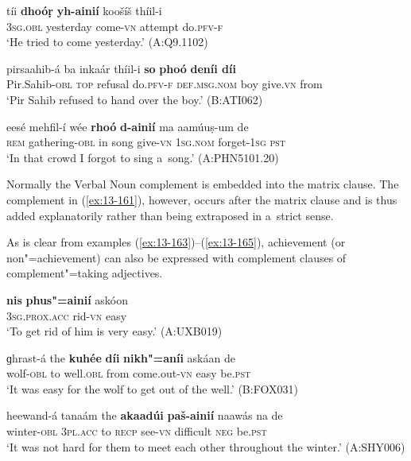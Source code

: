 \begin{exe}
\ex
\label{ex:13-160}
\gll tíi \textbf{dhoóṛ} \textbf{yh-ainií} koošíš thíil-i \\
\textsc{3sg.obl} yesterday come-\textsc{vn} attempt do.\textsc{pfv-f} \\
\glt `He tried to come yesterday.' (A:Q9.1102)

\ex
\label{ex:13-161}
\gll pirsaahib-á ba inkaár thíil-i \textbf{so} \textbf{phoó} \textbf{ deníi díi} \\
Pir.Sahib-\textsc{obl} \textsc{top} refusal do.\textsc{pfv-f} \textsc{def.msg.nom} boy  give.\textsc{vn} from \\
\glt `Pir Sahib refused to hand over the boy.' (B:ATI062)

\ex
\label{ex:13-162}
\gll eesé mehfil-í wée \textbf{rhoó} \textbf{d-ainií} ma  aamúuṣ-um de \\
\textsc{rem} gathering-\textsc{obl} in song give-\textsc{vn} \textsc{1sg.nom} forget-\textsc{1sg} \textsc{pst} \\
\glt `In that crowd I forgot to sing a~song.' (A:PHN5101.20) 
\end{exe}

Normally the Verbal Noun complement is embedded into the matrix clause. The complement in (\ref{ex:13-161}), however, occurs after the matrix clause and is thus added explanatorily rather than being extraposed in a~strict sense.


As is clear from examples (\ref{ex:13-163})--(\ref{ex:13-165}), achievement (or non"=achievement) can also be expressed with complement clauses of complement"=taking adjectives.

\begin{exe}
\ex
\label{ex:13-163}
\gll \textbf{nis} \textbf{phus"=ainií} askóon \\
\textsc{3sg.prox.acc} rid-\textsc{vn} easy \\
\glt `To get rid of him is very easy.' (A:UXB019)

\ex
\label{ex:13-164}
\gll ɡhrast-á the \textbf{kuhée} \textbf{díi} \textbf{nikh"=aníi} askáan de  \\
wolf-\textsc{obl} to well.\textsc{obl} from come.out-\textsc{vn} easy be.\textsc{pst}  \\
\glt `It was easy for the wolf to get out of the well.' (B:FOX031)

\ex
\label{ex:13-165}
\gll heewand-á tanaám the \textbf{akaadúi} \textbf{paš-ainií} naawás  na de \\
winter-\textsc{obl} \textsc{3pl.acc} to \textsc{recp} see-\textsc{vn} difficult \textsc{neg} be.\textsc{pst} \\
\glt `It was not hard for them to meet each other throughout the winter.' (A:SHY006) 
\end{exe}

